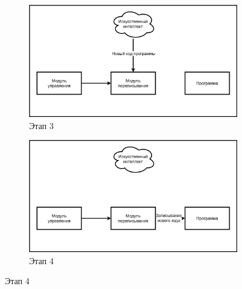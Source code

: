 \begin{figure}[h!]
    \begin{subfigure}[b]{0.5\textwidth}
        \centering
        \includegraphics[width=\textwidth]{images/METAMORPHLLM2.png} %
        \caption{Этап 3}
        \label{fig:photo_221_3}
    \end{subfigure}%
    \hfill %
    \begin{subfigure}[b]{0.5\textwidth}
        \centering
        \includegraphics[width=\textwidth]{images/METAMORPHLLM3.png} %
        \caption{Этап 4}
        \label{fig:photo_221_4}
    \end{subfigure}

    \vspace{\baselineskip} %


\end{figure}
